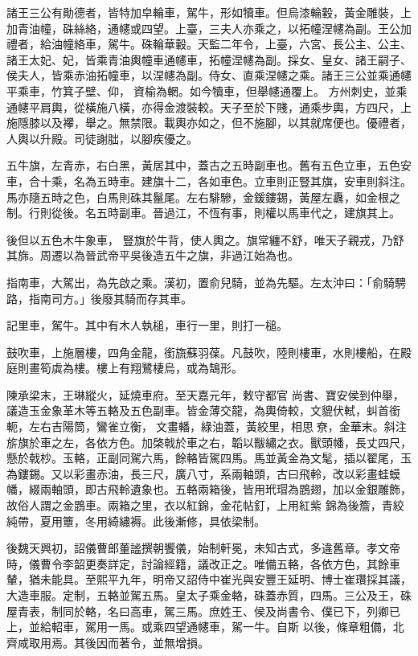 \begin{pinyinscope}
 諸王三公有勛德者，皆特加皁輪車，駕牛，形如犢車。但烏漆輪轂，黃金雕裝，上加青油幢，硃絲絡，通幰或四望。上臺，三夫人亦乘之，以拓幢涅幰為副。王公加禮者，給油幢絡車，駕牛。硃輪華轂。天監二年令，上臺，六宮、長公主、公主、諸王太妃、妃，皆乘青油輿幢車通幰車，拓幢涅幰為副。採女、皇女、諸王嗣子、侯夫人，皆乘赤油拓幢車，以涅幰為副。侍女、直乘涅幰之乘。諸王三公並乘通幰平乘車，竹箕子壁、仰，資榆為輞。如今犢車，但舉幰通覆上。
 方州刺史，並乘通幰平肩輿，從橫施八橫，亦得金渡裝較。天子至於下賤，通乘步輿，方四尺，上施隱膝以及襻，舉之。無禁限。載輿亦如之，但不施腳，以其就席便也。優禮者，人輿以升殿。司徒謝朏，以腳疾優之。



 五牛旗，左青赤，右白黑，黃居其中，蓋古之五時副車也。舊有五色立車，五色安車，合十乘，名為五時車。建旗十二，各如車色。立車則正豎其旗，安車則斜注。馬亦隨五時之色，白馬則硃其鬣尾。左右騑驂，金鍰鏤錫，黃屋左纛，如金根之制。行則從後。名五時副車。晉過江，不恆有事，則權以馬車代之，建旗其上。



 後但以五色木牛象車，
 豎旗於牛背，使人輿之。旗常纏不舒，唯天子親戎，乃舒其旆。周遷以為晉武帝平吳後造五牛之旗，非過江始為也。



 指南車，大駕出，為先啟之乘。漢初，置俞兒騎，並為先驅。左太沖曰：「俞騎騁路，指南司方。」後廢其騎而存其車。



 記里車，駕牛。其中有木人執槌，車行一里，則打一槌。



 鼓吹車，上施層樓，四角金龍，銜旒蘇羽葆。凡鼓吹，陸則樓車，水則樓船，在殿庭則畫筍虡為樓。樓上有翔鷺棲烏，或為鵠形。



 陳承梁末，王琳縱火，延燒車府。至天嘉元年，敕守都官
 尚書、寶安侯到仲舉，議造玉金象革木等五輅及五色副車。皆金薄交龍，為輿倚較，文貔伏軾，虯首銜軛，左右吉陽筒，鸞雀立衡，𣝛文畫轓，綠油蓋，黃絞里，相思尞，金華末。斜注旂旗於車之左，各依方色。加棨戟於車之右，韜以黻繡之衣。獸頭幡，長丈四尺，懸於戟杪。玉輅，正副同駕六馬，餘輅皆駕四馬。馬並黃金為文髦，插以翟尾，玉為鏤錫。又以彩畫赤油，長三尺，廣八寸，系兩軸頭，古曰飛軨，改以彩畫蛙蟆幡，綴兩軸頭，即古飛軨遺象也。五輅兩箱後，皆用玳瑁為鵾翅，加以金銀雕飾，故俗人謂之金鵾車。兩箱之里，衣以紅錦，金花帖釘，上用紅紫
 錦為後簷，青絞純帶，夏用簟，冬用綺繡褥。此後漸修，具依梁制。



 後魏天興初，詔儀曹郎董謐撰朝饗儀，始制軒冕，未知古式，多違舊章。孝文帝時，儀曹令李韶更奏詳定，討論經籍，議改正之。唯備五輅，各依方色，其餘車輦，猶未能具。至熙平九年，明帝又詔侍中崔光與安豐王延明、博士崔瓚採其議，大造車服。定制，五輅並駕五馬。皇太子乘金輅，硃蓋赤質，四馬。三公及王，硃屋青表，制同於輅，名曰高車，駕三馬。庶姓王、侯及尚書令、僕已下，列卿已上，並給軺車，駕用一馬。或乘四望通幰車，駕一牛。自斯
 以後，條章粗備，北齊咸取用焉。其後因而著令，並無增損。




\end{pinyinscope}
